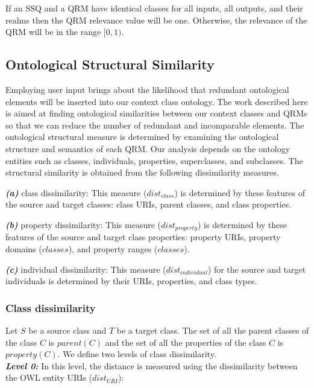 \documentclass{IOS-Book-Article}
\begin{document}
If an SSQ and a QRM have identical classes for all inputs, all outputs, and their realms then the QRM relevance value will be one. Otherwise, the relevance of the QRM will be in the range $[0, 1)$.   


\subsection{Ontological Structural Similarity}
\label{sec:oss}
Employing user input brings about the likelihood that redundant ontological elements will be inserted into our context class ontology. The work described here is aimed at finding ontological similarities between our context classes and QRMs so that we can reduce the number of redundant and incomparable elements. The ontological structural measure is determined by examining the ontological structure and semantics of each QRM. Our analysis depends on the ontology entities such as classes, individuals, properties, superclasses, and subclasses. The structural similarity is obtained from the following dissimilarity measures. 
 
\textit{\textbf{(a)}} class dissimilarity: This measure ($dist_{class}$) is determined by these features of the source and target classes: class URIs, parent classes, and class properties. 

\textit{\textbf{(b)}} property dissimilarity: This measure ($dist_{property}$) is determined by these features of the source and target class properties: property URIs, property domains ($classes$), and property ranges ($classes$). 

\textit{\textbf{(c)}} individual dissimilarity: This measure ($dist_{individual}$) for the source and target individuals is determined by their URIs, properties, and class types.

\subsubsection{Class dissimilarity}
Let $S$ be a source class and $T$ be a target class. The set of all the parent classes of the class $C$ is $parent(C)$ and the set of all the properties of the class $C$ is $property(C)$. We define two levels of class dissimilarity.\\
\indent \textit{\textbf{Level 0:}} In this level, the distance is measured using the dissimilarity between the OWL entity URIs ($dist_{URI}$):
\end{document}
